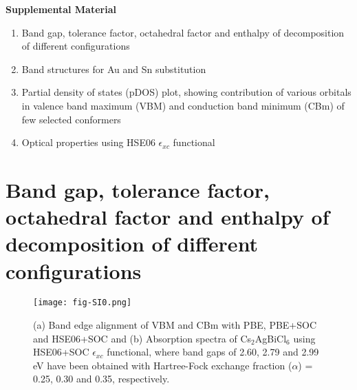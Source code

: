 \documentclass[journal=jpclcd,manuscript=letter]{achemso}
\begin{document}
\begin{center}
{\Large \bf Supplemental Material}\\ 
\end{center}
\begin{enumerate}[\bf I.]
\item Band gap, tolerance factor, octahedral factor and enthalpy of decomposition of different configurations 
\item Band structures for Au and Sn substitution
\item Partial density of states (pDOS) plot, showing contribution of various orbitals in valence band maximum (VBM) and conduction band minimum (CBm) of few selected conformers
\item Optical properties using HSE06 $\epsilon_{xc}$ functional \end{enumerate}
\vspace*{12pt}
\newpage
\section{{Band gap, tolerance factor, octahedral factor and enthalpy of decomposition of different configurations}}

\begin{figure}[H]
    \centering
	\texttt{[image: fig-SI0.png]}
	\caption{(a) Band edge alignment of VBM and CBm with PBE, PBE+SOC and HSE06+SOC and (b) Absorption spectra of Cs$_2$AgBiCl$_6$ using HSE06+SOC $\epsilon_{xc}$ functional, where band gaps of 2.60, 2.79 and 2.99 eV have been obtained with Hartree-Fock exchange fraction ($\alpha$) = 0.25, 0.30 and 0.35, respectively.}
	\label{fig2}
\end{figure}
\end{document}
